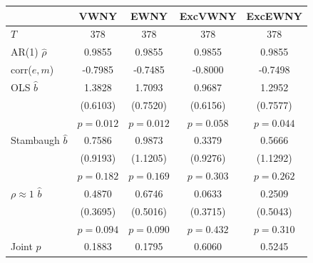 \begin{tabular}{lcccc}
\toprule
 & VWNY & EWNY & ExcVWNY & ExcEWNY \\
\midrule
$T$ & 378 & 378 & 378 & 378 \\
AR(1) $\hat\rho$ & 0.9855 & 0.9855 & 0.9855 & 0.9855 \\
corr($e,m$) & -0.7985 & -0.7485 & -0.8000 & -0.7498 \\
\midrule
OLS $\hat b$ & 1.3828 & 1.7093 & 0.9687 & 1.2952 \\
 & (0.6103) & (0.7520) & (0.6156) & (0.7577) \\
 & $p=0.012$ & $p=0.012$ & $p=0.058$ & $p=0.044$ \\
Stambaugh $\hat b$ & 0.7586 & 0.9873 & 0.3379 & 0.5666 \\
 & (0.9193) & (1.1205) & (0.9276) & (1.1292) \\
 & $p=0.182$ & $p=0.169$ & $p=0.303$ & $p=0.262$ \\
$\rho\approx1$ $\hat b$ & 0.4870 & 0.6746 & 0.0633 & 0.2509 \\
 & (0.3695) & (0.5016) & (0.3715) & (0.5043) \\
 & $p=0.094$ & $p=0.090$ & $p=0.432$ & $p=0.310$ \\
\midrule
Joint $p$ & 0.1883 & 0.1795 & 0.6060 & 0.5245 \\
\bottomrule
\end{tabular}
